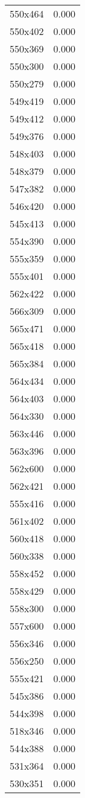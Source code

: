 \begin{table}
\begin{tabular}{lr}
550x464 & 0.000 \\
550x402 & 0.000 \\
550x369 & 0.000 \\
550x300 & 0.000 \\
550x279 & 0.000 \\
549x419 & 0.000 \\
549x412 & 0.000 \\
549x376 & 0.000 \\
548x403 & 0.000 \\
548x379 & 0.000 \\
547x382 & 0.000 \\
546x420 & 0.000 \\
545x413 & 0.000 \\
554x390 & 0.000 \\
555x359 & 0.000 \\
555x401 & 0.000 \\
562x422 & 0.000 \\
566x309 & 0.000 \\
565x471 & 0.000 \\
565x418 & 0.000 \\
565x384 & 0.000 \\
564x434 & 0.000 \\
564x403 & 0.000 \\
564x330 & 0.000 \\
563x446 & 0.000 \\
563x396 & 0.000 \\
562x600 & 0.000 \\
562x421 & 0.000 \\
555x416 & 0.000 \\
561x402 & 0.000 \\
560x418 & 0.000 \\
560x338 & 0.000 \\
558x452 & 0.000 \\
558x429 & 0.000 \\
558x300 & 0.000 \\
557x600 & 0.000 \\
556x346 & 0.000 \\
556x250 & 0.000 \\
555x421 & 0.000 \\
545x386 & 0.000 \\
544x398 & 0.000 \\
518x346 & 0.000 \\
544x388 & 0.000 \\
531x364 & 0.000 \\
530x351 & 0.000 \\

\end{tabular}
\end{table}
